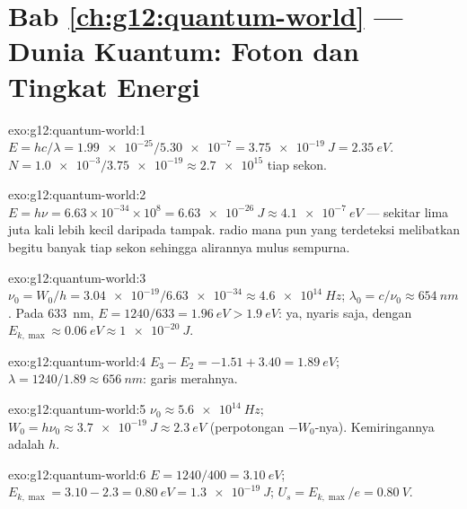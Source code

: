 \section*{Bab \ref{ch:g12:quantum-world} --- Dunia Kuantum: Foton dan Tingkat Energi}

\begin{solution}{exo:g12:quantum-world:1}
$E = hc/\lambda = \num{1.99e-25}/\num{5.30e-7} = \qty{3.75e-19}{J} =
\qty{2.35}{eV}$. $N = \num{1.0e-3}/\num{3.75e-19} \approx \num{2.7e15}$
 tiap sekon.
\end{solution}

\begin{solution}{exo:g12:quantum-world:2}
$E = h\nu = 6.63\times10^{-34} \times 10^{8} = \qty{6.63e-26}{J}
\approx \qty{4.1e-7}{eV}$ --- sekitar lima juta kali lebih kecil daripada
 tampak.  radio mana pun yang terdeteksi melibatkan begitu banyak 
tiap sekon sehingga alirannya mulus sempurna.
\end{solution}

\begin{solution}{exo:g12:quantum-world:3}
$\nu_0 = W_0/h = \num{3.04e-19}/\num{6.63e-34} \approx
\qty{4.6e14}{Hz}$; $\lambda_0 = c/\nu_0 \approx \qty{654}{nm}$. Pada
\qty{633}{nm}, $E = 1240/633 = \qty{1.96}{eV} > \qty{1.9}{eV}$: ya,
nyaris saja, dengan $E_{k,\max} \approx \qty{0.06}{eV} \approx \qty{1e-20}{J}$.
\end{solution}

\begin{solution}{exo:g12:quantum-world:4}
$E_3 - E_2 = -1.51 + 3.40 = \qty{1.89}{eV}$;
$\lambda = 1240/1.89 \approx \qty{656}{nm}$: garis merahnya.
\end{solution}

\begin{solution}{exo:g12:quantum-world:5}
$\nu_0 \approx \qty{5.6e14}{Hz}$; $W_0 = h\nu_0 \approx
\qty{3.7e-19}{J} \approx \qty{2.3}{eV}$ (perpotongan $-W_0$-nya).
Kemiringannya adalah  $h$.
\end{solution}

\begin{solution}{exo:g12:quantum-world:6}
$E = 1240/400 = \qty{3.10}{eV}$; $E_{k,\max} = 3.10 - 2.3 =
\qty{0.80}{eV} = \qty{1.3e-19}{J}$; $U_s = E_{k,\max}/e =
\qty{0.80}{V}$.
\end{solution}

